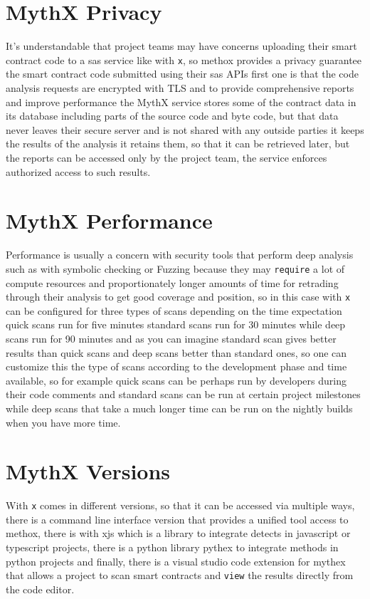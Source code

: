 \section{MythX Privacy}

It's understandable that project teams may have concerns uploading their smart contract code to a sas service like with \verb|x|, so methox provides a privacy guarantee the smart contract code submitted using their sas APIs first one is that the code analysis requests are encrypted with TLS and to provide comprehensive reports and improve performance the MythX service stores some of the contract data in its database including parts of the source code and byte code, but that data never leaves their secure server and is not shared with any outside parties it keeps the results of the analysis it retains them, so that it can be retrieved later, but the reports can be accessed only by the project team, the service enforces authorized access to such results.

\section{MythX Performance}

Performance is usually a concern with security tools that perform deep analysis such as with symbolic checking or Fuzzing because they may \verb|require| a lot of compute resources and proportionately longer amounts of time for retrading through their analysis to get good coverage and position, so in this case with \verb|x| can be configured for three types of scans depending on the time expectation quick scans run for five minutes standard scans run for 30 minutes while deep scans run for 90 minutes and as you can imagine standard scan gives better results than quick scans and deep scans better than standard ones, so one can customize this the type of scans according to the development phase and time available, so for example quick scans can be perhaps run by developers during their code comments and standard scans can be run at certain project milestones while deep scans that take a much longer time can be run on the nightly builds when you have more time.

\section{MythX Versions}

With \verb|x| comes in different versions, so that it can be accessed via multiple ways, there is a command line interface version that provides a unified tool access to methox, there is with xjs which is a library to integrate detects in javascript or typescript projects, there is a python library pythex to integrate methods in python projects and finally, there is a visual studio code extension for mythex that allows a project to scan smart contracts and \verb|view| the results directly from the code editor.


